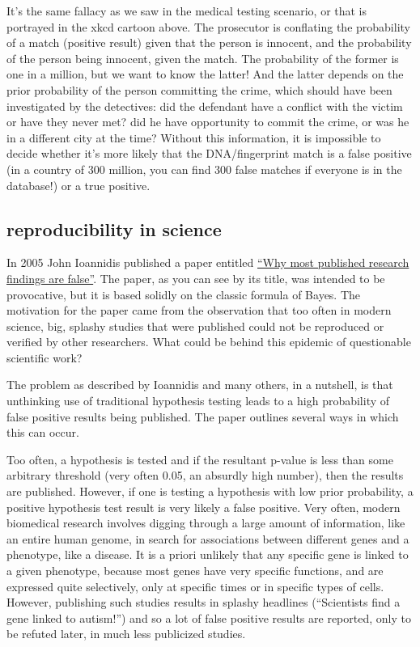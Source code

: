 \documentclass[
  letterpaper,
  DIV=11,
  numbers=noendperiod]{scrreprt}
\begin{document}
It's the same fallacy as we saw in the medical testing scenario, or that
is portrayed in the xkcd cartoon above. The prosecutor is conflating the
probability of a match (positive result) given that the person is
innocent, and the probability of the person being innocent, given the
match. The probability of the former is one in a million, but we want to
know the latter! And the latter depends on the prior probability of the
person committing the crime, which should have been investigated by the
detectives: did the defendant have a conflict with the victim or have
they never met? did he have opportunity to commit the crime, or was he
in a different city at the time? Without this information, it is
impossible to decide whether it's more likely that the DNA/fingerprint
match is a false positive (in a country of 300 million, you can find 300
false matches if everyone is in the database!) or a true positive.

\hypertarget{reproducibility-in-science}{%
\subsection{reproducibility in
science}\label{reproducibility-in-science}}

In 2005 John Ioannidis published a paper entitled
\href{https://journals.plos.org/plosmedicine/article?id=10.1371/journal.pmed.0020124}{``Why
most published research findings are false''}. The paper, as you can see
by its title, was intended to be provocative, but it is based solidly on
the classic formula of Bayes. The motivation for the paper came from the
observation that too often in modern science, big, splashy studies that
were published could not be reproduced or verified by other researchers.
What could be behind this epidemic of questionable scientific work?

The problem as described by Ioannidis and many others, in a nutshell, is
that unthinking use of traditional hypothesis testing leads to a high
probability of false positive results being published. The paper
outlines several ways in which this can occur.

Too often, a hypothesis is tested and if the resultant p-value is less
than some arbitrary threshold (very often 0.05, an absurdly high
number), then the results are published. However, if one is testing a
hypothesis with low prior probability, a positive hypothesis test result
is very likely a false positive. Very often, modern biomedical research
involves digging through a large amount of information, like an entire
human genome, in search for associations between different genes and a
phenotype, like a disease. It is a priori unlikely that any specific
gene is linked to a given phenotype, because most genes have very
specific functions, and are expressed quite selectively, only at
specific times or in specific types of cells. However, publishing such
studies results in splashy headlines (``Scientists find a gene linked to
autism!'') and so a lot of false positive results are reported, only to
be refuted later, in much less publicized studies.
\end{document}
